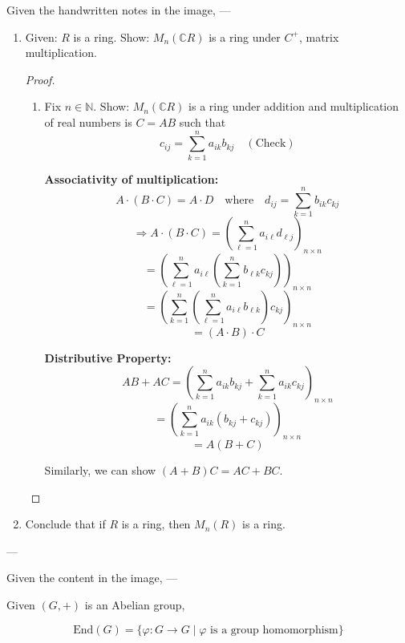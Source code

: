 \documentclass[11pt]{article}
\theoremstyle{definition}
\theoremstyle{remark}
\begin{document}
Given the handwritten notes in the image, 
---

\begin{enumerate}
    \item Given: $R$ is a ring. Show: $M_n(\mathbb{C} R)$ is a ring under $C^+$, matrix multiplication.

    \begin{proof}
        \begin{enumerate}
            \item[(iii)] Fix $n \in \mathbb{N}$. Show: $M_n(\mathbb{C} R)$ is a ring under addition and multiplication of real numbers is $C = AB$ such that
            \[
            c_{ij} = \sum_{k=1}^n a_{ik} b_{kj} \quad (\text{Check})
            \]

            \textbf{Associativity of multiplication:}
            \[
            A \cdot (B \cdot C) = A \cdot D \quad \text{where} \quad d_{ij} = \sum_{k=1}^n b_{ik} c_{kj}
            \]
            \[
            \Rightarrow A \cdot (B \cdot C) = \left( \sum_{\ell=1}^n a_{i\ell} d_{\ell j} \right)_{n \times n}
            \]
            \[
            = \left( \sum_{\ell=1}^n a_{i\ell} \left( \sum_{k=1}^n b_{\ell k} c_{kj} \right) \right)_{n \times n}
            \]
            \[
            = \left( \sum_{k=1}^n \left( \sum_{\ell=1}^n a_{i\ell} b_{\ell k} \right) c_{kj} \right)_{n \times n}
            \]
            \[
            = (A \cdot B) \cdot C
            \]

            \textbf{Distributive Property:}
            \[
            AB + AC = \left( \sum_{k=1}^n a_{ik} b_{kj} + \sum_{k=1}^n a_{ik} c_{kj} \right)_{n \times n}
            \]
            \[
            = \left( \sum_{k=1}^n a_{ik} (b_{kj} + c_{kj}) \right)_{n \times n}
            \]
            \[
            = A (B + C)
            \]

            Similarly, we can show $(A + B) C = AC + BC$.
        \end{enumerate}
    \end{proof}

    \item[(iv)] Conclude that if $R$ is a ring, then $M_n(R)$ is a ring.
\end{enumerate}

---

Given the content in the image, 
---

Given $(G, +)$ is an Abelian group,

\[
\text{End}(G) = \{ \varphi : G \to G \mid \varphi \text{ is a group homomorphism} \}
\]
\end{document}
